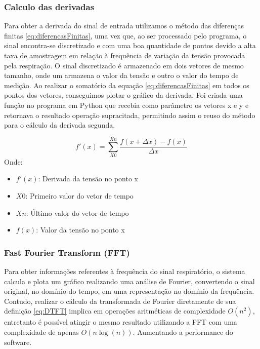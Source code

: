 \subsubsection{Calculo das derivadas}

Para obter a derivada do sinal de entrada utilizamos o método das diferenças finitas \ref{eq:diferencasFinitas}, uma vez que, ao ser processado pelo programa, o sinal encontra-se discretizado e com uma boa quantidade de pontos devido a alta taxa de amostragem em relação à frequência de variação da tensão provocada pela respiração. O sinal discretizado é armazenado em dois vetores de mesmo tamanho, onde um armazena o valor da tensão e outro o valor do tempo de medição. Ao realizar o somatório da equação \ref{eq:diferencasFinitas} em todos os pontos dos vetores, conseguimos plotar o gráfico da derivada. Foi criada uma função no programa em Python que recebia como parâmetro os vetores x e y e retornava o resultado operação supracitada, permitindo assim o reuso do método para o cálculo da derivada segunda.


\begin{equation} \label{eq:diferencasFinitas}
	f'(x) =  \sum_{X0}^{Xn} \dfrac{f(x+\Delta x) - f(x)}{\Delta x}
\end{equation}
Onde:
\begin{itemize}[label=]
	\item $f'(x)$: Derivada da tensão no ponto x
	\item $X0$: Primeiro valor do vetor de tempo
	\item $Xn$: Último valor do vetor de tempo
	\item $f(x)$: Valor da tensão no ponto x
\end{itemize}

\subsubsection{Fast Fourier Transform (FFT)}

Para obter informações referentes à frequência do sinal respiratório, o sistema calcula e plota um gráfico realizando uma análise de Fourier, convertendo o sinal original, no domínio do tempo, em uma representação no domínio da frequência. Contudo,  realizar o cálculo da transformada de Fourier diretamente de sua definição \ref{eq:DTFT} implica em operações aritméticas de complexidade  \boldmath $O(n^2)$, entretanto é possível atingir o mesmo resultado utilizando a FFT com uma complexidade de apenas $O(n \log (n)) $.   \unboldmath Aumentando a performance do software.



